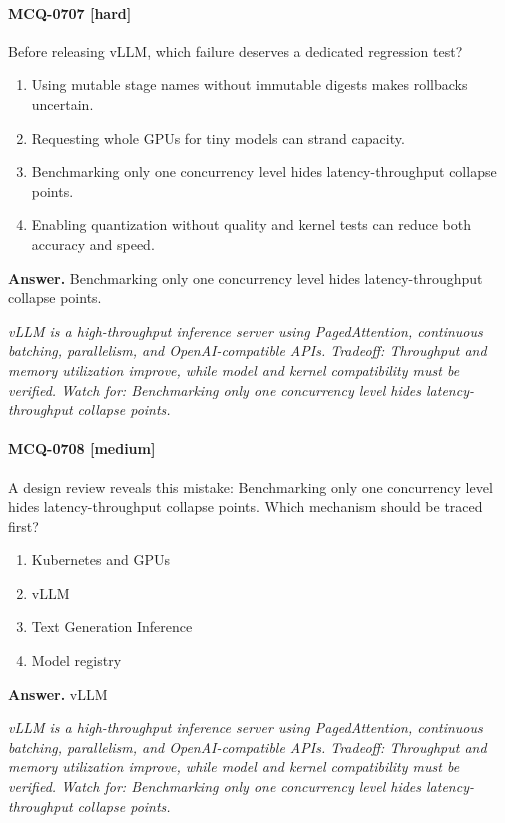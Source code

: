 \paragraph{MCQ-0707 [hard]} Before releasing vLLM, which failure deserves a dedicated regression test?
\begin{enumerate}[label=\Alph*.]
\item Using mutable stage names without immutable digests makes rollbacks uncertain.
\item Requesting whole GPUs for tiny models can strand capacity.
\item Benchmarking only one concurrency level hides latency-throughput collapse points.
\item Enabling quantization without quality and kernel tests can reduce both accuracy and speed.
\end{enumerate}
\noindent\textbf{Answer.} Benchmarking only one concurrency level hides latency-throughput collapse points.
\par\textit{vLLM is a high-throughput inference server using PagedAttention, continuous batching, parallelism, and OpenAI-compatible APIs. Tradeoff: Throughput and memory utilization improve, while model and kernel compatibility must be verified. Watch for: Benchmarking only one concurrency level hides latency-throughput collapse points.}
\paragraph{MCQ-0708 [medium]} A design review reveals this mistake: Benchmarking only one concurrency level hides latency-throughput collapse points. Which mechanism should be traced first?
\begin{enumerate}[label=\Alph*.]
\item Kubernetes and GPUs
\item vLLM
\item Text Generation Inference
\item Model registry
\end{enumerate}
\noindent\textbf{Answer.} vLLM
\par\textit{vLLM is a high-throughput inference server using PagedAttention, continuous batching, parallelism, and OpenAI-compatible APIs. Tradeoff: Throughput and memory utilization improve, while model and kernel compatibility must be verified. Watch for: Benchmarking only one concurrency level hides latency-throughput collapse points.}
